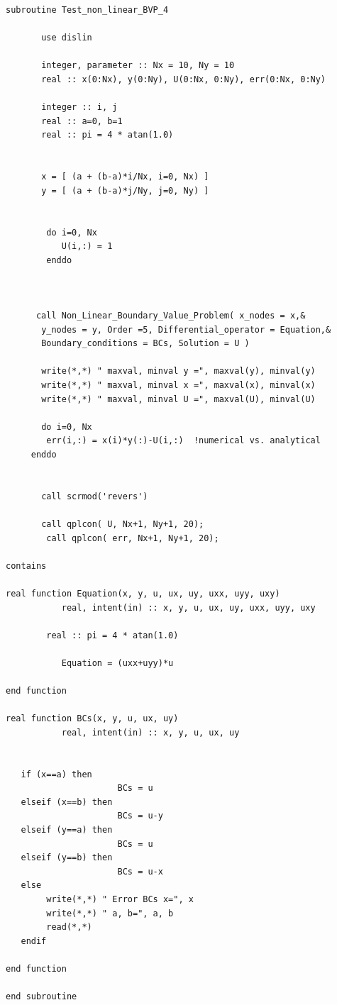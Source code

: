 \begin{blueframed}
\begin{lstlisting}
subroutine Test_non_linear_BVP_4

       use dislin

       integer, parameter :: Nx = 10, Ny = 10
       real :: x(0:Nx), y(0:Ny), U(0:Nx, 0:Ny), err(0:Nx, 0:Ny)

       integer :: i, j
       real :: a=0, b=1
       real :: pi = 4 * atan(1.0)


       x = [ (a + (b-a)*i/Nx, i=0, Nx) ]
       y = [ (a + (b-a)*j/Ny, j=0, Ny) ]

       
        do i=0, Nx
           U(i,:) = 1
     	enddo



      call Non_Linear_Boundary_Value_Problem( x_nodes = x,&
       y_nodes = y, Order =5, Differential_operator = Equation,&
       Boundary_conditions = BCs, Solution = U )

       write(*,*) " maxval, minval y =", maxval(y), minval(y)
       write(*,*) " maxval, minval x =", maxval(x), minval(x)
       write(*,*) " maxval, minval U =", maxval(U), minval(U)
       
       do i=0, Nx
        err(i,:) = x(i)*y(:)-U(i,:)  !numerical vs. analytical
     enddo


       call scrmod('revers')

       call qplcon( U, Nx+1, Ny+1, 20);
        call qplcon( err, Nx+1, Ny+1, 20);

contains

real function Equation(x, y, u, ux, uy, uxx, uyy, uxy)
           real, intent(in) :: x, y, u, ux, uy, uxx, uyy, uxy

        real :: pi = 4 * atan(1.0)

           Equation = (uxx+uyy)*u

end function

real function BCs(x, y, u, ux, uy)
           real, intent(in) :: x, y, u, ux, uy


   if (x==a) then
                      BCs = u
   elseif (x==b) then
                      BCs = u-y
   elseif (y==a) then
                      BCs = u
   elseif (y==b) then
                      BCs = u-x
   else
        write(*,*) " Error BCs x=", x
        write(*,*) " a, b=", a, b
        read(*,*)
   endif

end function

end subroutine

\end{lstlisting}
\end{blueframed}






